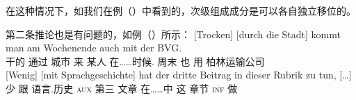 \noindent
在这种情况下，如我们在例（）中看到的，次级组成成分是可以各自独立移位的。\citep{deKuthy2002a} 

第二条推论也是有问题的，如例（）所示：
\eal
\label{bsp-mehr-vf}
\ex\label{bsp-trocken-durch-die-stadt}
\gll {}[Trocken]       [durch        die          Stadt] kommt man am                       Wochenende auch mit der BVG.\footnotemark\\
       \spacebr{}干的 \spacebr{}通过  城市   来    某人 在……时候. 周末 也 用  柏林运输公司\\
\ex 
\gll {}[Wenig]     [mit Sprachgeschichte] hat der dritte Beitrag in dieser Rubrik zu tun, [\ldots]\footnotemark\\
       \spacebr{}少 \spacebr{}跟 语言.历史 \textsc{aux}  第三 文章 在……中 这 章节 \textsc{inf} 做\\
\zl

